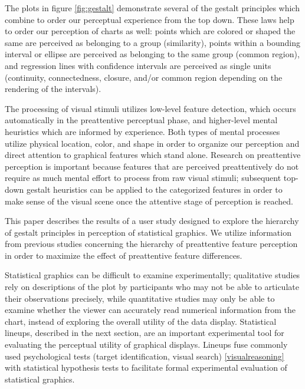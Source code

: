 \documentclass[11pt]{isuthesis}\usepackage[]{graphicx}\usepackage[]{color}
\begin{document}
The plots in figure \ref{fig:gestalt} demonstrate several of the gestalt principles which combine to order our perceptual experience from the top down. These laws help to order our perception of charts as well: points which are colored or shaped the same are perceived as belonging to a group (similarity), points within a bounding interval or ellipse are perceived as belonging to the same group (common region), and regression lines with confidence intervals are perceived as single units (continuity, connectedness, closure, and/or common region depending on the rendering of the intervals). 

The processing of visual stimuli utilizes low-level feature detection, which occurs automatically in the preattentive perceptual phase, and higher-level mental heuristics which are informed by experience. Both types of mental processes utilize physical location, color, and shape in order to organize our perception and direct attention to graphical features which stand alone. 
Research on preattentive perception is important because features that are perceived preattentively do not require as much mental effort to process from raw visual stimuli; subsequent top-down gestalt heuristics can be applied to the categorized features in order to make sense of the visual scene once the attentive stage of perception is reached.

This paper describes the results of a user study designed to explore the hierarchy of gestalt principles in perception of statistical graphics. We utilize information from previous studies \citep{heer:2014, robinson:03} concerning the hierarchy of preattentive feature perception in order to maximize the effect of preattentive feature differences. 

Statistical graphics can be difficult to examine experimentally; qualitative studies rely on descriptions of the plot by participants who may not be able to articulate their observations precisely, while quantitative studies may only be able to examine whether the viewer can accurately read numerical information from the chart, instead of exploring the overall utility of the data display. Statistical lineups, described in the next section, are an important experimental tool for evaluating the perceptual utility of graphical displays. Lineups fuse commonly used psychological tests (target identification, visual search) \ref{visualreasoning} with statistical hypothesis tests to facilitate formal experimental evaluation of statistical graphics. 
\end{document}
